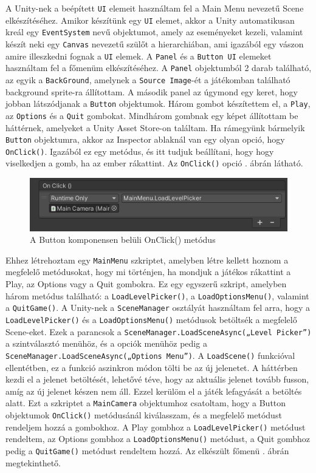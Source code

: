 A Unity-nek a beépített \texttt{UI} elemeit használtam fel a Main Menu nevezetű Scene elkészítéséhez. Amikor készítünk egy \texttt{UI} elemet, akkor a Unity automatikusan kreál egy \texttt{EventSystem} nevű objektumot, amely az eseményeket kezeli, valamint készít neki egy \texttt{Canvas} nevezetű szülőt a hierarchiában, ami igazából egy vászon amire illeszkedni fognak a \texttt{UI} elemek. A \texttt{Panel} és a \texttt{Button UI} elemeket használtam fel a főmenüm elkészítéséhez. A \texttt{Panel} objektumból 2 darab található, az egyik a \texttt{BackGround}, amelynek a \texttt{Source Image}-ét a játékomban található background sprite-ra állítottam. A második panel az úgymond egy keret, hogy jobban látszódjanak a \texttt{Button} objektumok. Három gombot készítettem el, a \texttt{Play}, az \texttt{Options} és a \texttt{Quit} gombokat. Mindhárom gombnak egy képet állítottam be háttérnek, amelyeket a Unity Asset Store-on találtam. Ha rámegyünk bármelyik \texttt{Button} objektumra, akkor az Inspector ablaknál van egy olyan opció, hogy \texttt{OnClick()}. Igazából ez egy metódus, és itt tudjuk beállítani, hogy hogy viselkedjen a gomb, ha az ember rákattint. Az \texttt{OnClick()} opció . ábrán látható.

\begin{figure}[ht]
\centering
\includegraphics[scale = 0.9]{images/onclick.png}
\caption{A Button komponensen belüli OnClick() metódus}
\label{fig:onclick}
\end{figure}

Ehhez létrehoztam egy \texttt{MainMenu} szkriptet, amelyben létre kellett hoznom a megfelelő metódusokat, hogy mi történjen, ha mondjuk a játékos rákattint a Play, az Options vagy a Quit gombokra. Ez egy egyszerű szkript, amelyben három metódus található: a \texttt{LoadLevelPicker()}, a \texttt{LoadOptionsMenu()}, valamint a \texttt{QuitGame()}. A Unity-nek a \texttt{SceneManager} osztályát használtam fel arra, hogy a \texttt{LoadLevelPicker()} és a \texttt{LoadOptionsMenu()} metódusok betöltsék a megfelelő Scene-eket. Ezek a parancsok a \texttt{SceneManager.LoadSceneAsync(„Level Picker”)} a szintválasztó menühöz, és a opciók menühöz pedig a  \texttt{SceneManager.LoadSceneAsync(„Options Menu”)}. 
A \texttt{LoadScene()} funkcióval ellentétben, ez a funkció aszinkron módon tölti be az új jelenetet. A háttérben kezdi el a jelenet betöltését, lehetővé téve, hogy az aktuális jelenet tovább fusson, amíg az új jelenet készen nem áll. Ezzel kerülöm el a játék lefagyását a betöltés alatt. Ezt a szkriptet a \texttt{MainCamera} objektumhoz csatoltam, hogy a Button objektumok \texttt{OnClick()} metódusánál kiválasszam, és a megfelelő metódust rendeljem hozzá a gombokhoz. A Play gombhoz a \texttt{LoadLevelPicker()} metódust rendeltem, az Options gombhoz a \texttt{LoadOptionsMenu()} metódust, a Quit gombhoz pedig a \texttt{QuitGame()} metódust rendeltem hozzá. Az elkészült főmenü . ábrán megtekinthető.

